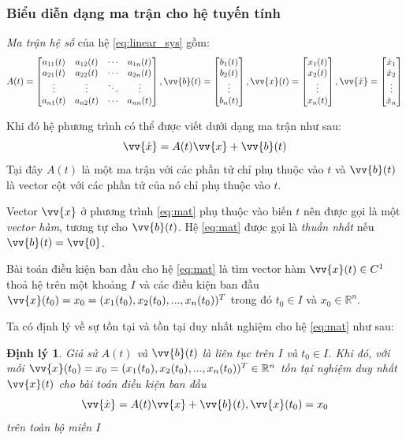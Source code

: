 \documentclass[a4paper]{article}
\newtheorem{theorem}{{\bf Định lý}}
\begin{document}
\subsubsection{Biểu diễn dạng ma trận cho hệ tuyến tính}
\textit{Ma trận hệ số} của hệ \eqref{eq:linear_sys} gồm:
\begin{equation*}
A(t) = 
\begin{bmatrix}
a_{11}(t) & a_{12}(t) & \cdots & a_{1n}(t) \\
a_{21}(t) & a_{22}(t) & \cdots & a_{2n}(t) \\
\vdots  & \vdots  & \ddots & \vdots  \\
a_{n1}(t) & a_{n2}(t) & \cdots & a_{nn}(t) 
\end{bmatrix},  
\vv{b}(t) = 
\begin{bmatrix}
b_1(t) \\ 
b_2(t) \\
\vdots \\
b_n(t)
\end{bmatrix},
\vv{x}(t) = 
\begin{bmatrix}
x_1(t) \\ 
x_2(t) \\
\vdots \\
x_n(t)
\end{bmatrix},
\vv{\dot{x}} = 
\begin{bmatrix}
\dot{x}_1 \\ 
\dot{x}_2 \\
\vdots \\
\dot{x}_n
\end{bmatrix}
\end{equation*} \par
Khi đó hệ phương trình có thể được viết dưới dạng ma trận như sau:
\begin{equation}\label{eq:mat}
    \vv{\dot{x}} = A(t)\vv{x} + \vv{b}(t)
\end{equation}
Tại đây $A(t)$ là một ma trận với các phần tử chỉ phụ thuộc vào $t$ và $\vv{b}(t)$ là vector cột với các phần tử của nó chỉ phụ thuộc vào $t$.\par
Vector $\vv{x}$ ở phương trình \eqref{eq:mat} phụ thuộc vào biến $t$ nên được gọi là một \emph{vector hàm}, tương tự cho $\vv{b}(t)$.
Hệ \eqref{eq:mat} được gọi là \emph{thuần nhất} nếu $\vv{b}(t) = \vv{0}$. \par

Bài toán điều kiện ban đầu cho hệ \eqref{eq:mat} là tìm vector hàm $\vv{x}(t) \in C^1$ thoả hệ \label{eq:matrix} trên một khoảng $I$ và các điều kiện ban đầu $\vv{x}(t_0) = x_0 = (x_{1}(t_0), x_{2}(t_0),...,x_{n}(t_0))^T$ trong đó $t_0 \in I$ và $x_0 \in \mathbb{R}^n$. \par
Ta có định lý về sự tồn tại và tồn tại duy nhất nghiệm cho hệ \eqref{eq:mat} như sau:
\begin{theorem}
Giả sử $A(t)$ và $\vv{b}(t)$ là liên tục trên $I$ và $t_0 \in I$. Khi đó, với mỗi $\vv{x}(t_0) = x_0 = (x_{1}(t_0), x_{2}(t_0),...,x_{n}(t_0))^T \in \mathbb{R}^n$ tồn tại nghiệm duy nhất $\vv{x}(t)$ cho bài toán điều kiện ban đầu 
\[
    \vv{\dot{x}} = A(t)\vv{x} + \vv{b}(t), \vv{x}(t_0) = x_0
\]
trên toàn bộ miền $I$
\end{theorem} 
\end{document}

